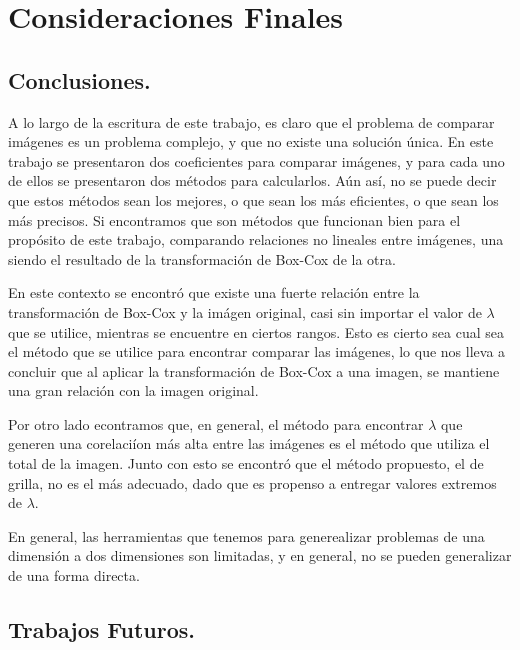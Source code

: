 \chapter{Consideraciones Finales}\label{chap6}

\section{Conclusiones.}


    A lo largo de la escritura de este trabajo, es claro que el problema de comparar im\'agenes es un problema complejo, y que no existe una soluci\'on \'unica. En este trabajo se presentaron dos coeficientes para comparar im\'agenes, y para cada uno de ellos se presentaron dos m\'etodos para calcularlos. A\'un as\'i, no se puede decir que estos m\'etodos sean los mejores, o que sean los m\'as eficientes, o que sean los m\'as precisos. Si encontramos que son m\'etodos que funcionan bien para el prop\'osito de este trabajo, comparando relaciones no lineales entre im\'agenes, una siendo el resultado de la transformaci\'on de Box-Cox de la otra.

    En este contexto se encontr\'o que existe una fuerte relaci\'on entre la transformaci\'on de Box-Cox y la im\'agen original, casi sin importar el valor de $\lambda$ que se utilice, mientras se encuentre en ciertos rangos. Esto es cierto sea cual sea el m\'etodo que se utilice para encontrar comparar las im\'agenes, lo que nos lleva a concluir que al aplicar la transformaci\'on de Box-Cox a una imagen, se mantiene una gran relaci\'on con la imagen original.

    Por otro lado econtramos que, en general, el m\'etodo para encontrar $\lambda$ que generen una corelaci\'ion m\'as alta entre las im\'agenes es el m\'etodo que utiliza el total de la imagen. Junto con esto se encontr\'o que el m\'etodo propuesto, el de grilla, no es el m\'as adecuado, dado que es propenso a entregar valores extremos de $\lambda$. 

    En general, las herramientas que tenemos para generealizar problemas de una dimensi\'on a dos dimensiones son limitadas, y en general, no se pueden generalizar de una forma directa.
    


\section{Trabajos Futuros.}

